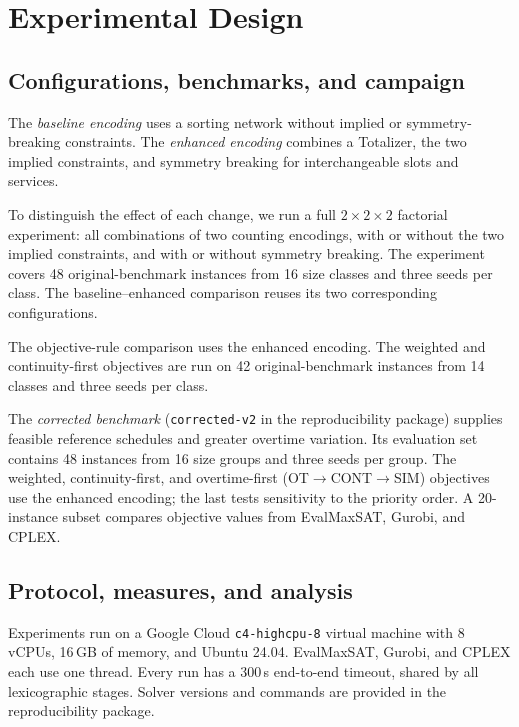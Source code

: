 \documentclass[sigconf,nonacm]{acmart}
\begin{document}
\section{Experimental Design}
\label{sec:experiments}

\subsection{Configurations, benchmarks, and campaign}

The \emph{baseline encoding} uses a sorting network without implied or
symmetry-breaking constraints.  The \emph{enhanced encoding} combines a
Totalizer, the two implied constraints, and symmetry breaking for
interchangeable slots and services.

To distinguish the effect of each change, we run a full $2\times2\times2$
factorial experiment: all combinations of two counting encodings, with or
without the two implied constraints, and with or without symmetry breaking.
The experiment covers 48 original-benchmark instances from 16 size classes and
three seeds per class.  The baseline--enhanced comparison reuses its two
corresponding configurations.

The objective-rule comparison uses the enhanced encoding.  The weighted and
continuity-first objectives are run on 42 original-benchmark instances from 14
classes and three seeds per class.

The \emph{corrected benchmark} (\texttt{corrected-v2} in the reproducibility
package) supplies feasible reference schedules and greater overtime variation.
Its evaluation set contains 48 instances from 16 size groups and three seeds per
group.  The weighted, continuity-first, and overtime-first
(OT${\to}$CONT${\to}$SIM) objectives use the enhanced encoding; the last tests
sensitivity to the priority order.  A 20-instance subset compares objective
values from EvalMaxSAT, Gurobi, and CPLEX.

\subsection{Protocol, measures, and analysis}

Experiments run on a Google Cloud \texttt{c4-highcpu-8} virtual machine with 8
vCPUs, 16\,GB of memory, and Ubuntu 24.04.  EvalMaxSAT, Gurobi, and CPLEX each
use one thread.  Every run has a 300\,s end-to-end timeout, shared by all
lexicographic stages.  Solver versions and commands are provided in the
reproducibility package.
\end{document}
